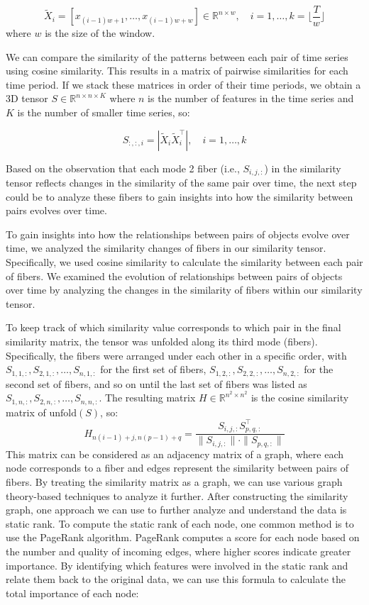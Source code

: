 \documentclass[twoside,11pt]{article}
\begin{document}
\[  
\tilde{X}_i = [x_{(i-1)w + 1}, \ldots, x_{(i-1)w + w}] \in \mathbb{R}^{n \times w}, \quad i = 1, \ldots, k = \lfloor \frac{T}{w}   \rfloor  
\]
where \( w \) is the size of the window.

We can compare the similarity of the patterns between each pair of time series using cosine similarity. This results in a matrix of pairwise similarities for each time period. If we stack these matrices in order of their time periods, we obtain a 3D tensor   
\(
S \in \mathbb{R}^{n \times n \times K}  
\)
where \( n \) is the number of features in the time series and \( K \) is the number of smaller time series, so:  

\[  
S_{:,:,i} = |\tilde{X}_i \tilde{X}_i^\top|, \quad i = 1, \ldots, k  
\]  

Based on the observation that each mode 2 fiber (i.e., \( S_{i,j,:} \)) in the similarity tensor reflects changes in the similarity of the same pair over time, the next step could be to analyze these fibers to gain insights into how the similarity between pairs evolves over time.   

To gain insights into how the relationships between pairs of objects evolve over time, we analyzed the similarity changes of fibers in our similarity tensor. Specifically, we used cosine similarity to calculate the similarity between each pair of fibers. We examined the evolution of relationships between pairs of objects over time by analyzing the changes in the similarity of fibers within our similarity tensor.   


To keep track of which similarity value corresponds to which pair in the final similarity matrix, the tensor was unfolded along its third mode (fibers). Specifically, the fibers were arranged under each other in a specific order, with   
\(  
S_{1,1,:}, S_{2,1,:}, \ldots, S_{n,1,:}   
\)
for the first set of fibers,   
\(   
S_{1,2,:}, S_{2,2,:}, \ldots, S_{n,2,:}  
\)
for the second set of fibers, and so on until the last set of fibers was listed as   
\(  
S_{1,n,:}, S_{2,n,:}, \ldots, S_{n,n,:}.  
\) 
The resulting matrix   
\(   
H \in \mathbb{R}^{n^2 \times n^2}  
\)
is the cosine similarity matrix of \(\text{unfold}(S)\), so:
\[  
H_{n(i-1) + j, n(p-1) + q} = \frac{S_{i,j,:} S_{p,q,:}^\top}{\| S_{i,j,:} \| \cdot \| S_{p,q,:} \|}  
\] 
This matrix can be considered as an adjacency matrix of a graph, where each node
corresponds to a fiber and edges represent the similarity between pairs of fibers. By treating
the similarity matrix as a graph, we can use various graph theory-based techniques to
analyze it further.
After constructing the similarity graph, one approach we can use to further analyze and
understand the data is static rank. To compute the static rank of each node, one common
method is to use the PageRank algorithm. PageRank computes a score for each node
based on the number and quality of incoming edges, where higher scores indicate greater
importance.
By identifying which features were involved in the static rank and relate them back to
the original data, we can use this formula to calculate the total importance of each node:
\end{document}
